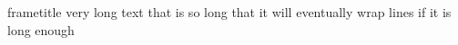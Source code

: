 \documentclass{beamer}
\begin{document}
\begin{frame}

\begin{beamercolorbox}[sep=0.3cm,left,wd=\textwidth]{frametitle}
    very long text that is so long that it will eventually wrap lines if it is long enough
\end{beamercolorbox}

\end{frame}
\end{document}
